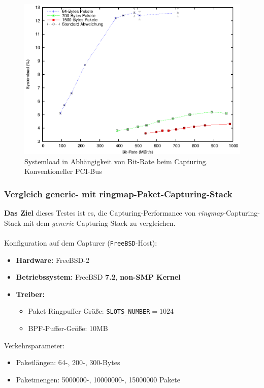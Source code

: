 {\begin{figure} 
\centering \includegraphics[width=5.5in]{plots/graphs/sysload_PCI_mbs.eps}
\caption{Systemload in Abhängigkeit von Bit-Rate beim Capturing. Konventioneller PCI-Bus}
\label{img:plot_sysload_pci_mbs}
\end{figure}
}
\subsubsection{Vergleich generic- mit ringmap-Paket-Capturing-Stack}\label{sec:erg_verg}
\textbf{Das Ziel} dieses Testes ist es, die Capturing-Performance von 
\emph{ringmap}-Capturing-Stack mit dem \emph{generic}-Capturing-Stack
zu vergleichen.\\\\
%
Konfiguration auf dem Capturer (\verb+FreeBSD+-Host): 
\begin{itemize}
	\item \textbf{Hardware:} FreeBSD-2 
	\item \textbf{Betriebssystem:} FreeBSD \textbf{7.2}, \textbf{non-SMP Kernel}
	\item \textbf{Treiber:} 
		\begin{itemize}
			\item Paket-Ringpuffer-Größe: \verb+SLOTS_NUMBER+$=1024$
			\item BPF-Puffer-Größe: 10MB
		\end{itemize}
\end{itemize}
Verkehrsparameter:
\begin{itemize}
	\item Paketlängen: 64-, 200-, 300-Bytes
	\item Paketmengen: 5000000-, 10000000-, 15000000 Pakete 
\end{itemize}

